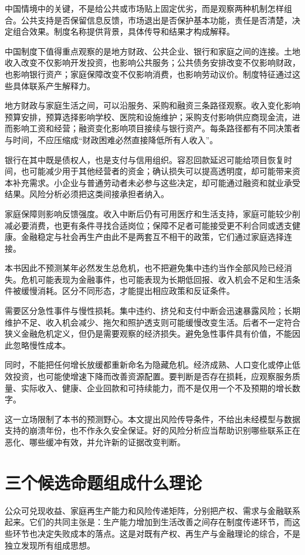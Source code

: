 \documentclass[UTF8,fontset=fandol,zihao=-4,oneside,openany]{ctexbook}
\begin{document}
中国情境中的关键，不是给公共或市场贴上固定优劣，而是观察两种机制怎样组合。公共支持是否保留信息反馈，市场退出是否保护基本功能，责任是否清楚，决定组合效果。制度名称提供背景，具体传导和结果才构成解释。

中国制度下值得重点观察的是地方财政、公共企业、银行和家庭之间的连接。土地收入改变不仅影响开发投资，也影响公共服务；公共债务安排改变不仅影响财政，也影响银行资产；家庭保障改变不仅影响消费，也影响劳动议价。制度特征通过这些具体联系产生解释力。

\label{arg:P242}
地方财政与家庭生活之间，可以沿服务、采购和融资三条路径观察。收入变化影响预算安排，预算选择影响学校、医院和设施维护；采购支付影响供应商现金流，进而影响工资和经营；融资变化影响项目接续与银行资产。每条路径都有不同决策者与时间，不应压缩成“财政困难必然直接降低所有人收入”。

银行在其中既是债权人，也是支付与信用组织。容忍回款延迟可能给项目恢复时间，也可能减少用于其他经营者的资金；确认损失可以提高透明度，却可能带来资本补充需求。小企业与普通劳动者未必参与这些决定，却可能通过融资和就业承受结果。风险分析必须把这类间接承担者纳入。

家庭保障则影响反馈强度。收入中断后仍有可用医疗和生活支持，家庭可能较少削减必要消费，也更有条件寻找合适岗位；保障不足者可能接受更不利合同或透支健康。金融稳定与社会再生产由此不是两套互不相干的政策，它们通过家庭选择连接。

本书因此不预测某年必然发生总危机，也不把避免集中违约当作全部风险已经消失。危机可能表现为金融事件，也可能表现为长期低回报、收入机会不足和生活条件被缓慢消耗。区分不同形态，才能提出相应政策和反证条件。

\label{arg:P243}
需要区分急性事件与慢性损耗。集中违约、挤兑和支付中断会迅速暴露风险；长期维护不足、收入机会减少、拖欠和照护透支则可能缓慢改变生活。后者不一定符合狭义金融危机定义，但仍是需要观察的经济损失。避免急性事件具有价值，不能因此忽略慢性成本。

同时，不能把任何增长放缓都重新命名为隐藏危机。经济成熟、人口变化或停止低效投资，也可能使增速下降而改善资源配置。要判断是否存在损耗，应观察服务质量、实际收入、健康、企业回款和可持续能力，而不是仅用一个不及预期的增长数字。

这一立场限制了本书的预测野心。本文提出风险传导条件，不给出未经模型与数据支持的崩溃年份，也不作永久安全保证。好的风险分析应当帮助识别哪些联系正在恶化、哪些缓冲有效，并允许新的证据改变判断。

\section{三个候选命题组成什么理论}
公众可兑现收益、家庭再生产能力和风险传递矩阵，分别把产权、需求与金融联系起来。它们的共同主张是：生产能力增加到生活改善之间存在制度传递环节，而这些环节也决定失败成本的落点。这是对既有产权、再生产与金融理论的综合，不是独立发现所有组成思想。
\end{document}
